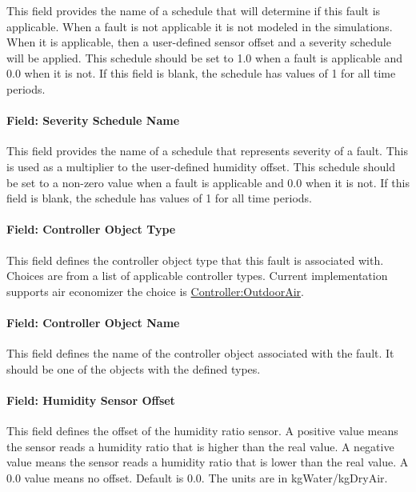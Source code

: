 This field provides the name of a schedule that will determine if this fault is applicable. When a fault is not applicable it is not modeled in the simulations. When it is applicable, then a user-defined sensor offset and a severity schedule will be applied. This schedule should be set to 1.0 when a fault is applicable and 0.0 when it is not. If this field is blank, the schedule has values of 1 for all time periods.

\paragraph{Field: Severity Schedule Name}\label{field-severity-schedule-name-1}

This field provides the name of a schedule that represents severity of a fault. This is used as a multiplier to the user-defined humidity offset. This schedule should be set to a non-zero value when a fault is applicable and 0.0 when it is not. If this field is blank, the schedule has values of 1 for all time periods.

\paragraph{Field: Controller Object Type}\label{field-controller-object-type-1}

This field defines the controller object type that this fault is associated with. Choices are from a list of applicable controller types. Current implementation supports air economizer the choice is \hyperref[controlleroutdoorair]{Controller:OutdoorAir}.

\paragraph{Field: Controller Object Name}\label{field-controller-object-name-1}

This field defines the name of the controller object associated with the fault. It should be one of the objects with the defined types.

\paragraph{Field: Humidity Sensor Offset}\label{field-humidity-sensor-offset}

This field defines the offset of the humidity ratio sensor. A positive value means the sensor reads a humidity ratio that is higher than the real value. A negative value means the sensor reads a humidity ratio that is lower than the real value. A 0.0 value means no offset. Default is 0.0. The units are in kgWater/kgDryAir.

